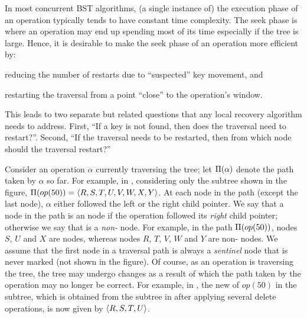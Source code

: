 In most concurrent BST algorithms, (a single instance of) the execution phase of an operation typically tends to have constant time complexity. The seek phase is where an operation may end up spending most of its time especially if the tree is large. Hence, it is desirable to make the seek phase of an operation more efficient by:
\begin{enumerate*}[label=(\roman*)]
\item reducing the number of restarts due to ``suspected'' key movement, and
\item restarting the traversal from a point ``close'' to the operation's window.
\end{enumerate*}
This leads to two separate but related questions that any local recovery algorithm needs to address. First, ``If a key is not found, then does the traversal need to restart?''. Second, ``If the traversal needs to be restarted, then from which node should the traversal restart?''

Consider an operation $\alpha$ currently traversing the tree; let $\Pi(\alpha)$ denote the path taken by $\alpha$ so far. For example, in , considering only the subtree shown in the figure, $\Pi(op(50)) = \langle R, S, T, U, V, W, X, Y \rangle$. At each node in the path (except the last node), $\alpha$ either followed 
the left or the right child pointer. We say that a node in the path is an \emph{\myanchor} node if the operation followed its \emph{right} child pointer; otherwise we say that is a 
\emph{non-\myanchor{}} node. For example, in the path $\Pi(op(50))$, nodes $S$, $U$ and $X$ are \myanchor{} nodes, whereas nodes $R$, $T$, $V$, $W$ and $Y$ 
are non-\myanchor{} nodes. We assume that the first \myanchor{} node in a traversal path is always a \emph{sentinel} node that is never marked (not shown in the figure). Of course, as an operation is traversing the tree, the tree may undergo changes as a result of which the path taken by the operation may no longer be correct. For example, in , the new \accesspath of $op(50)$ in the subtree, which is obtained from the subtree in  after applying several delete operations, is now given 
by $\langle R, S, T, U \rangle$. 


